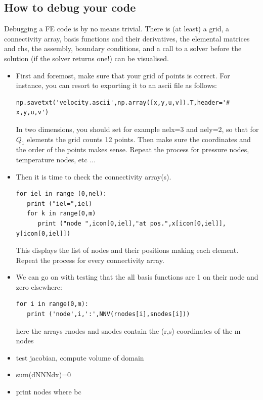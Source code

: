 \subsection{How to debug your code}


Debugging a FE code is by no means trivial. There is (at least) a grid, a connectivity array, basis functions and their derivatives, the elemental matrices and rhs, the assembly, boundary conditions, and a call to a solver before the solution (if the solver returns one!) can be visualised. 
\begin{itemize}
\item First and foremost, make sure that your grid of points is correct.
For instance, you can resort to exporting it to an ascii file as follows:
\begin{lstlisting}
np.savetxt('velocity.ascii',np.array([x,y,u,v]).T,header='# x,y,u,v')
\end{lstlisting}
In two dimensions, you should set for example nelx=3 and nely=2, so that 
for $Q_1$ elements the grid counts 12 points. Then make sure the coordinates and the order of the points makes sense. 
Repeat the process for pressure nodes, temperature nodes, etc ...

\item Then it is time to check the connectivity array(s). 
\begin{lstlisting}
for iel in range (0,nel):
   print ("iel=",iel)
   for k in range(0,m)
      print ("node ",icon[0,iel],"at pos.",x[icon[0,iel]], y[icon[0,iel]])
\end{lstlisting}
This displays the list of nodes and their positions making each element.
Repeat the process for every connectivity array.

\item We can go on with testing that the all basis functions are 1 on their node and  zero elsewhere:
\begin{lstlisting}
for i in range(0,m):
   print ('node',i,':',NNV(rnodes[i],snodes[i]))
\end{lstlisting}
here the arrays rnodes and snodes contain the (r,s) coordinates of the m nodes 

\item test jacobian, compute volume of domain

\item sum(dNNNdx)=0

\item print nodes where bc 

\end{itemize}

